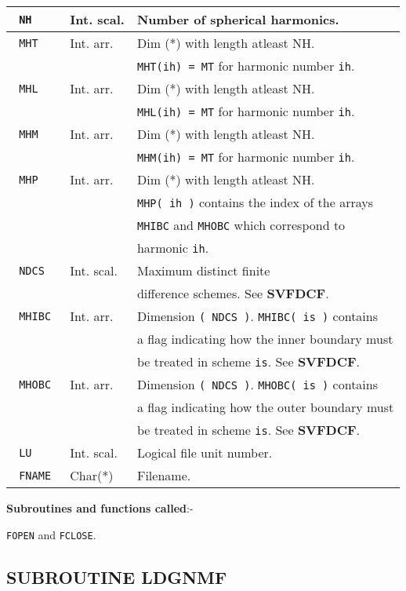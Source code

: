 \begin{tabular}{|l|l|l|}
\hline
\verb+ NH + & Int. scal. & Number of spherical harmonics. \\
\hline
\verb+ MHT + & Int. arr. & Dim (*) with length atleast NH. \\
& & \verb+MHT(ih) = MT+ for harmonic number \verb+ih+. \\
\hline
\verb+ MHL + & Int. arr. & Dim (*) with length atleast NH. \\
& & \verb+MHL(ih) = MT+ for harmonic number \verb+ih+. \\
\hline
\verb+ MHM + & Int. arr. & Dim (*) with length atleast NH. \\
& & \verb+MHM(ih) = MT+ for harmonic number \verb+ih+. \\
\hline
\verb+ MHP + & Int. arr. & Dim (*) with length atleast NH. \\
& & \verb+MHP( ih )+ contains the index of the arrays \\
& & \verb+MHIBC+ and \verb+MHOBC+ which correspond to \\
& & harmonic \verb+ih+. \\
\hline
\verb+ NDCS + & Int. scal. & Maximum distinct finite \\
& & difference schemes. See {\bf SVFDCF}. \\
\hline
\verb+ MHIBC + & Int. arr. & Dimension \verb+( NDCS )+. \verb+MHIBC( is )+
contains \\
& & a flag indicating how the inner boundary must \\
& & be treated in scheme \verb+is+. See {\bf SVFDCF}. \\
\hline
\verb+ MHOBC + & Int. arr. & Dimension \verb+( NDCS )+. \verb+MHOBC( is )+
contains \\
& & a flag indicating how the outer boundary must \\
& & be treated in scheme \verb+is+. See {\bf SVFDCF}. \\
\hline
\verb+ LU + & Int. scal. & Logical file unit number. \\
\hline
\verb+ FNAME + & Char(*) & Filename. \\
\hline
\end{tabular} \newline

{\bf Subroutines and functions called}:- \newline

\verb+FOPEN+ and
\verb+FCLOSE+.

\subsection{SUBROUTINE LDGNMF}
\label{sec:ldgnmfinfo}

